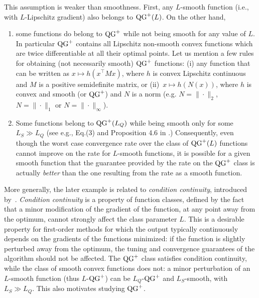 This assumption is weaker than smoothness. First, any $L$-smooth function (i.e., with $L$-Lipschitz gradient) also belongs to $\operatorname{QG}^+(L)$. On the other hand, 
\begin{enumerate}[itemsep=1pt,topsep=0pt,leftmargin=*]
    \item some functions do belong to $\operatorname{QG}^+$ while not being smooth for any value of $L$.  In particular $\operatorname{QG}^+$ contains all Lipschitz non-smooth convex functions which are twice differentiable at all their optimal points.
    Let us mention a few rules for obtaining (not necessarily smooth) $\operatorname{QG}^+$ functions: (i) any function that can be written as $x\mapsto h(x^\top M x)$, where $h$ is convex Lipschitz continuous and $M$ is a positive semidefinite matrix, or (ii)~$x\mapsto h(N(x))$, where $h$ is convex and smooth (or $\operatorname{QG}^+$) and $N$ is a norm (e.g. $N=\|\cdot\|_2$, $N=\|\cdot\|_1$ or $N=\|\cdot\|_\infty$).
    \item Some functions belong to $\operatorname{QG}^+(L_Q)$ while being smooth only for some $L_S \gg L_Q$
    (see e.g., Eq.(3) and Proposition 4.6 in \citep{guille2021study}.)
    Consequently, even though the worst case convergence rate over the class of $\operatorname{QG}^+(L)$ functions cannot improve on the rate for $L$-smooth functions, it is possible for a given smooth function that the guarantee provided by the rate on the $\operatorname{QG}^+$ class is actually \textit{better} than the one resulting from the rate as a smooth function.
\end{enumerate}
More generally, the later example is related to \emph{condition continuity}, introduced by~\citet[Definition 4.9]{guille2021study}.
\textit{Condition continuity} is a property of function classes, defined by the fact that a minor modification of the gradient of the function, at any point away from the optimum, cannot strongly affect the class parameter $L$. This is a desirable property for first-order methods for which the output typically continuously depends on the gradients of the functions minimized: if the function is slightly perturbed away from the optimum, the tuning and convergence guarantees of the algorithm should not be affected. The $\operatorname{QG}^+$ class satisfies condition continuity, while the class of smooth convex functions does not: 
a minor perturbation of an $L$-smooth function (thus $L$-$\operatorname{QG}^+$) can be $L_Q$-$\operatorname{QG}^+$ and $L_S$-smooth, with $L_S \gg L_Q$. This also motivates studying $\operatorname{QG}^+$.

